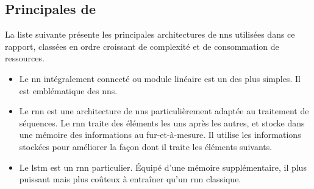 \subsection{Principales  de }
\label{def:lstm} \label{def:rnn} \label{def:fully_connected} \label{def:lin_module} \label{def:nn_2} 

La liste suivante présente les principales \glspl{architecture} de \glspl{nn} utilisées dans ce rapport, classées en ordre croissant de complexité et de consommation de ressources.

\begin{itemize}
	\item Le \gls{nn} intégralement connecté ou module linéaire est un des  plus simples. Il est emblématique des \glspl{nn}.
	
	\item Le \gls{rnn} est une \gls{architecture} de \glspl{nn} particulièrement adaptée au traitement de séquences. Le \gls{rnn} traite des éléments les uns après les autres, et stocke dans une \og mémoire \fg{} des informations au fur-et-à-mesure. Il utilise les informations stockées pour améliorer la façon dont il traite les éléments suivants. 
	
	\item Le \gls{lstm} est un \gls{rnn} particulier. Équipé d'une mémoire supplémentaire, il plus puissant mais plus coûteux à entraîner qu'un \gls{rnn} classique.
\end{itemize}


%
%

